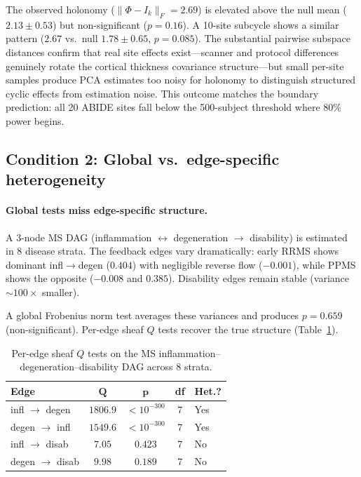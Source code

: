 \documentclass{article}
\begin{document}
The observed holonomy ($\|\Phi - I_k\|_F = 2.69$) is elevated above the null mean ($2.13 \pm 0.53$) but non-significant ($p = 0.16$).
A 10-site subcycle shows a similar pattern ($2.67$ vs.\ null $1.78 \pm 0.65$, $p = 0.085$).
The substantial pairwise subspace distances confirm that real site effects exist---scanner and protocol differences genuinely rotate the cortical thickness covariance structure---but small per-site samples produce PCA estimates too noisy for holonomy to distinguish structured cyclic effects from estimation noise.
This outcome matches the boundary prediction: all 20 ABIDE sites fall below the 500-subject threshold where 80\% power begins.

\subsection{Condition 2: Global vs.\ edge-specific heterogeneity}
\label{sec:res-global-vs-edge}

\paragraph{Global tests miss edge-specific structure.}
A 3-node MS DAG (inflammation $\leftrightarrow$ degeneration $\to$ disability) is estimated in 8 disease strata.
The feedback edges vary dramatically: early RRMS shows dominant infl$\to$degen ($0.404$) with negligible reverse flow ($-0.001$), while PPMS shows the opposite ($-0.008$ and $0.385$).
Disability edges remain stable (variance $\sim\!100\times$ smaller).

A global Frobenius norm test averages these variances and produces $p = 0.659$ (non-significant).
Per-edge sheaf $Q$ tests recover the true structure (Table~\ref{tab:dag}).

\begin{table}[t]
\centering
\caption{Per-edge sheaf $Q$ tests on the MS inflammation--degeneration--disability DAG across 8 strata.}
\label{tab:dag}
\small
\begin{tabular}{@{}lcccl@{}}
\toprule
\textbf{Edge} & $\boldsymbol{Q}$ & $\boldsymbol{p}$ & \textbf{df} & \textbf{Het.?} \\
\midrule
infl $\to$ degen & $1806.9$ & $< 10^{-300}$ & 7 & Yes \\
degen $\to$ infl & $1549.6$ & $< 10^{-300}$ & 7 & Yes \\
infl $\to$ disab & $7.05$ & $0.423$ & 7 & No \\
degen $\to$ disab & $9.98$ & $0.189$ & 7 & No \\
\bottomrule
\end{tabular}
\end{table}
\end{document}
